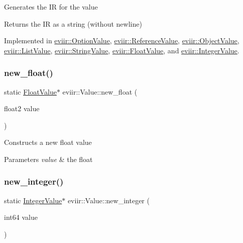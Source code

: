 Generates the IR for the value \begin{DoxyReturn}{Returns}
the IR as a string (without newline) 
\end{DoxyReturn}


Implemented in \hyperlink{classeviir_1_1OptionValue_abb9e9cbaa9f6c0af697e5cbea035f56a}{eviir\+::\+Option\+Value}, \hyperlink{classeviir_1_1ReferenceValue_a7b03ad70c7253d44fb7061a91751f9f6}{eviir\+::\+Reference\+Value}, \hyperlink{classeviir_1_1ObjectValue_a72adc8371c09638a785ed3823516e817}{eviir\+::\+Object\+Value}, \hyperlink{classeviir_1_1ListValue_ad12dee3774ad443ad0e27354909e8dc9}{eviir\+::\+List\+Value}, \hyperlink{classeviir_1_1StringValue_ab8c17f9426e993cd01bd67958aba0038}{eviir\+::\+String\+Value}, \hyperlink{classeviir_1_1FloatValue_a8713d6eb43445ba56c4104bce8fe7070}{eviir\+::\+Float\+Value}, and \hyperlink{classeviir_1_1IntegerValue_a7f2653e23a8165a0eb43109d152cc0a2}{eviir\+::\+Integer\+Value}.

\mbox{\label{classeviir_1_1Value_ad3079cc26bb4f64b00b88d9c6e98bad2}} 
\subsubsection{\texorpdfstring{new\+\_\+float()}{new\_float()}}
{\footnotesize\ttfamily static \hyperlink{classeviir_1_1FloatValue}{Float\+Value}$\ast$ eviir\+::\+Value\+::new\+\_\+float (\begin{DoxyParamCaption}\item[{float2}]{value }\end{DoxyParamCaption})\hspace{0.3cm}{\ttfamily [static]}}

Constructs a new float value 
\begin{DoxyParams}{Parameters}
{\em value} & the float \\
\hline
\end{DoxyParams}
\mbox{\label{classeviir_1_1Value_a4ca31d3ac1118e0d7c055f76b1b79316}} 
\subsubsection{\texorpdfstring{new\+\_\+integer()}{new\_integer()}}
{\footnotesize\ttfamily static \hyperlink{classeviir_1_1IntegerValue}{Integer\+Value}$\ast$ eviir\+::\+Value\+::new\+\_\+integer (\begin{DoxyParamCaption}\item[{int64}]{value }\end{DoxyParamCaption})\hspace{0.3cm}{\ttfamily [static]}}

